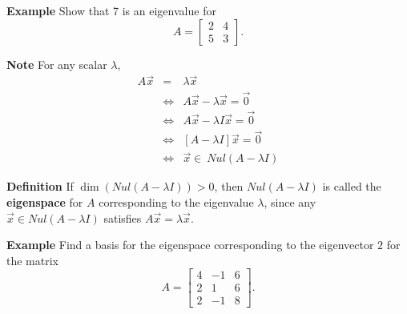   \begin{frame}[fragile]
\textbf{Example}
 Show that 7 is an eigenvalue for 
 \[
 A = \left[ \begin{array}{rrrrr} 2 & 4 \\ 5 & 3 \end{array} \right].
\]



\textbf{Note}
For any scalar $\lambda$,
\begin{eqnarray*}
 A \vec{x} &=& \lambda \vec{x}   \\
 &\Leftrightarrow&  
A \vec{x} -\lambda \vec{x} = \vec{0}  \\
 &\Leftrightarrow&  
 A \vec{x} -\lambda I \vec{x} = \vec{0}  \\
  &\Leftrightarrow& 
  \left[ A - \lambda I \right] \vec{x} =\vec{0} \\
   &\Leftrightarrow&  
\vec{x} \in \ Nul(A -\lambda I)
\end{eqnarray*}

\end{frame}




  \begin{frame}[fragile]
\textbf{Definition}
 If $\dim(Nul(A - \lambda I))>0$, then $Nul(A-\lambda I)$ is called the \textbf{eigenspace } for 
$A$ corresponding to the eigenvalue $\lambda$, since any 
$\vec{x}\in Nul(A-\lambda I) $ satisfies $A\vec{x} =  \lambda \vec{x}$.



\textbf{Example}
 Find a basis for the eigenspace corresponding to the eigenvector $2$ for the 
matrix
\[
 A = \left[ \begin{array}{rrrrr}
      4 & -1 & 6 \\
      2 & 1 & 6 \\
      2 & -1 & 8 
     \end{array} \right].
\]

\end{frame}




